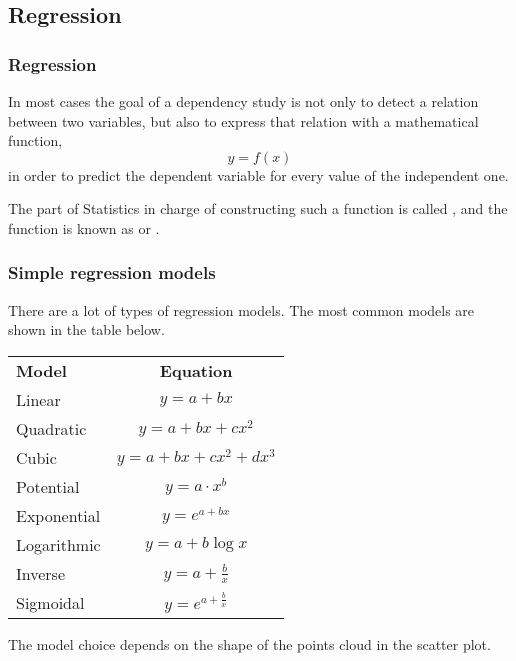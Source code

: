 \subsection{Regression}
\begin{frame}
\frametitle{Regression}
In most cases the goal of a dependency study is not only to detect a relation between two variables, but also to express that relation with a mathematical function, 
\[y=f(x)\]
in order to predict the dependent variable for every value of the independent one.   

The part of Statistics in charge of constructing such a function is called , and the function is known as  or .
\end{frame}


\begin{frame}
\frametitle{Simple regression models}
There are a lot of types of regression models.
The most common models are shown in the table below.

\begin{center}
\begin{tabular}{lc}
\toprule
\textbf{Model} & \textbf{Equation}\\
Linear & $y=a+bx$\\
Quadratic & $y=a+bx+cx^2$\\
Cubic & $y=a+bx+cx^2+dx^3$\\
Potential & $y=a\cdot x^b$\\
Exponential & $y=e^{a+bx}$\\
Logarithmic & $y=a+b\log x$\\
Inverse & $y = a+\frac{b}{x}$\\
Sigmoidal & $y= e^{a+\frac{b}{x}}$\\
\bottomrule
\end{tabular}
\end{center}

The model choice depends on the shape of the points cloud in the scatter plot.
\end{frame}


